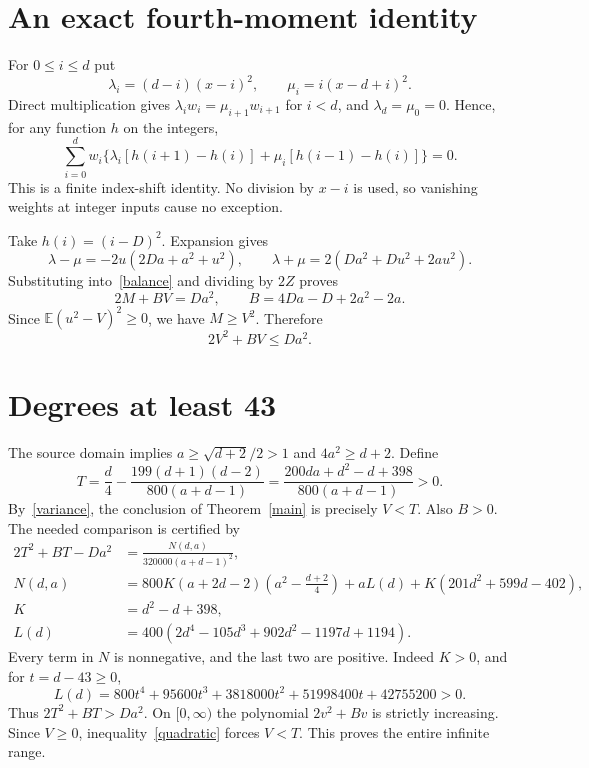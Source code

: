 \documentclass[11pt]{article}
\newcommand{\E}{\mathbb E}
\begin{document}
\section{An exact fourth-moment identity}
For $0\le i\le d$ put
\[
 \lambda_i=(d-i)(x-i)^2,\qquad \mu_i=i(x-d+i)^2.
\]
Direct multiplication gives
$\lambda_iw_i=\mu_{i+1}w_{i+1}$ for $i<d$, and
$\lambda_d=\mu_0=0$. Hence, for any function $h$ on the integers,
\begin{equation}\label{balance}
 \sum_{i=0}^dw_i\{\lambda_i[h(i+1)-h(i)]
                 +\mu_i[h(i-1)-h(i)]\}=0.
\end{equation}
This is a finite index-shift identity. No division by $x-i$ is used,
so vanishing weights at integer inputs cause no exception.

\newpage
Take $h(i)=(i-D)^2$. Expansion gives
\[
 \lambda-\mu=-2u(2Da+a^2+u^2),\qquad
 \lambda+\mu=2(Da^2+Du^2+2au^2).
\]
Substituting into~\eqref{balance} and dividing by $2Z$ proves
\begin{equation}\label{moment}
 2M+BV=Da^2,\qquad B=4Da-D+2a^2-2a.
\end{equation}
Since $\E(u^2-V)^2\ge0$, we have $M\ge V^2$. Therefore
\begin{equation}\label{quadratic}
 2V^2+BV\le Da^2.
\end{equation}

\section{Degrees at least 43}
The source domain implies $a\ge\sqrt{d+2}/2>1$ and $4a^2\ge d+2$.
Define
\[
 T=\frac d4-\frac{199(d+1)(d-2)}{800(a+d-1)}
   =\frac{200da+d^2-d+398}{800(a+d-1)}>0.
\]
By~\eqref{variance}, the conclusion of Theorem~\ref{main} is precisely
$V<T$. Also $B>0$. The needed comparison is certified by
\begin{align*}
 2T^2+BT-Da^2&=\frac{N(d,a)}{320000(a+d-1)^2},\\
 N(d,a)&=800K(a+2d-2)\left(a^2-\frac{d+2}{4}\right)
              +aL(d)+K(201d^2+599d-402),\\
 K&=d^2-d+398,\\
 L(d)&=400(2d^4-105d^3+902d^2-1197d+1194).
\end{align*}
Every term in $N$ is nonnegative, and the last two are positive.
Indeed $K>0$, and for $t=d-43\ge0$,
\[
 L(d)=800t^4+95600t^3+3818000t^2+51998400t+42755200>0.
\]
Thus $2T^2+BT>Da^2$. On $[0,\infty)$ the polynomial $2v^2+Bv$
is strictly increasing. Since $V\ge0$, inequality~\eqref{quadratic}
forces $V<T$. This proves the entire infinite range.
\end{document}
